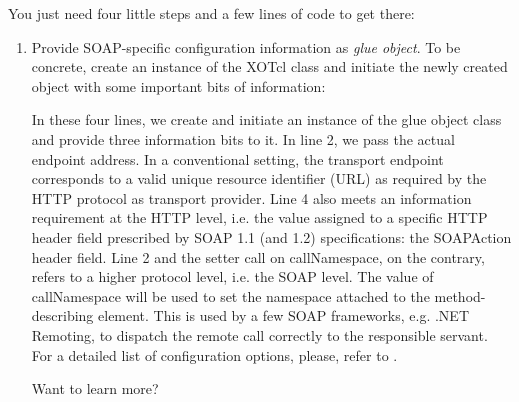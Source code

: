 You just need four little steps and a few lines of code to get there:
\begin{enumerate}
\item Provide SOAP-specific configuration information as \emph{glue object}. To be concrete, create an 
instance of the XOTcl class  and initiate the newly created object with some 
important bits of information:

In these four lines, we create and initiate an instance of the glue object class and provide three 
information bits to it. In line 2, we pass the actual endpoint address. In a conventional setting, the 
transport endpoint corresponds to a valid unique resource identifier (URL) as required by the HTTP 
protocol as transport provider. Line 4 also meets an information requirement at the HTTP level, i.e. the 
value assigned to a specific HTTP header field prescribed by SOAP 1.1 \cite{w3c:2000} (and 1.2) specifications: the 
SOAPAction header field. Line 2 and the setter call on callNamespace, on the contrary, refers to a higher 
protocol level, i.e. the SOAP level. The value of callNamespace will be used to set the namespace 
attached to the method-describing element. This is used by a few SOAP frameworks, e.g. .NET 
Remoting, to dispatch the remote call correctly to the responsible servant. For a detailed list of 
configuration options, please, refer to .

Want to learn more?


\end{enumerate}
